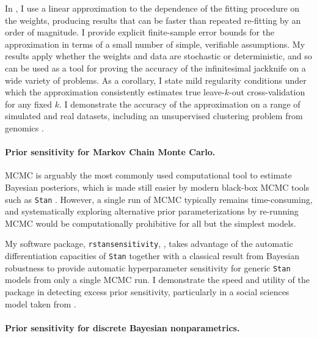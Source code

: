 In \citet{giordano:2019:ij}, I use a linear approximation to the
dependence of the fitting procedure on the weights, producing results that can
be faster than repeated re-fitting by an order of magnitude. I provide explicit
finite-sample error bounds for the approximation in terms of a small number of
simple, verifiable assumptions.  My results apply whether the weights and data
are stochastic or deterministic, and so can be used as a tool for proving the
accuracy of the infinitesimal jackknife on a wide variety of problems. As a
corollary, I state mild regularity conditions under which the approximation
consistently estimates true leave-$k$-out cross-validation for any fixed $k$. I
demonstrate the accuracy of the approximation on a range of simulated and real
datasets, including an unsupervised clustering problem from genomics
\citep{Luan:2003:clustering, shoemaker:2015:ultrasensitive}.


\paragraph{Prior sensitivity for Markov Chain Monte Carlo.}

MCMC is arguably the most commonly used computational tool to estimate Bayesian
posteriors, which is made still easier by modern black-box MCMC tools such as
\texttt{Stan} \citep{carpenter:2017:stan, rstan}.  However, a single run of MCMC
typically remains time-consuming, and systematically exploring alternative prior
parameterizations by re-running MCMC would be computationally prohibitive for
all but the simplest models.

My software package, \texttt{rstansensitivity},
\citep{giordano:2020:rstansensitivity, giordano:2018:mcmchyper}, takes advantage
of the automatic differentiation capacities of \texttt{Stan}
\citep{carpenter:2015:stanmath} together with a classical result from  Bayesian
robustness \citep{gustafson:1996:localposterior, basu:1996:local,
giordano:2018:covariances} to provide automatic hyperparameter sensitivity for
generic \texttt{Stan} models from only a single MCMC run.  I demonstrate the
speed and utility of the package in detecting excess prior sensitivity,
particularly in a social sciences model taken from \citet[Chapter
13.5]{gelman:2006:arm}.


\paragraph{Prior sensitivity for discrete Bayesian nonparametrics.}

